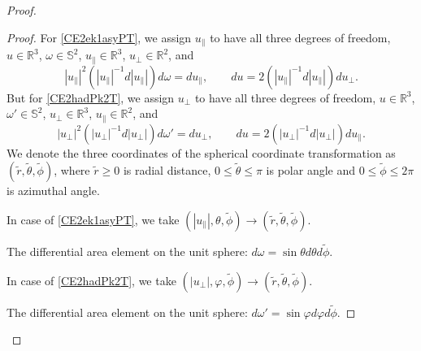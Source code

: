 \documentclass[reqno]{amsart}
\numberwithin{equation}{section}
\numberwithin{equation}{section}
\begin{document}
\begin{proof}
\begin{proof}
			For \eqref{CE2ek1asyPT}, we assign $u_{\parallel}$ to have all three degrees of freedom,  $u \in \mathbb{R}^3$, $\omega \in \mathbb{S}^2$, $u_{\parallel} \in \mathbb{R}^3$, $u_{\perp} \in \mathbb{R}^2$, and
			\begin{equation*}
				|u_{\parallel}|^{2}(|u_{\parallel}|^{-1}d|u_{\parallel}|)d\omega = du_{\parallel} ,\qquad du = 2(|u_{\parallel}|^{-1} d|u_{\parallel}|) du_{\perp}. 
			\end{equation*}
			But for \eqref{CE2hadPk2T}, we assign $u_{\perp}$ to have all three degrees of freedom,  $u \in \mathbb{R}^3$, $\omega' \in \mathbb{S}^2$, $u_{\perp} \in \mathbb{R}^3$, $u_{\parallel} \in \mathbb{R}^2$, and
			\begin{equation}\label{cgvbuprepdd}
				|u_{\perp}|^{2}(|u_{\perp}|^{-1}d|u_{\perp}|)d\omega' = du_{\perp} ,\qquad du =2 (|u_{\perp}|^{-1} d|u_\perp|) du_{\parallel}. 
			\end{equation}
			We denote the three coordinates of the spherical coordinate transformation as $(\tilde{r},\tilde{\theta},\tilde{\phi})$, where $\tilde{r}\geq0$ is radial distance, $0\leq\tilde{\theta}\leq \pi$ is polar angle and $0\leq\tilde{\phi}\leq 2 \pi$ is azimuthal angle.  
			
			In case of \eqref{CE2ek1asyPT}, we take $(|u_{\parallel}|,\theta,\tilde{\phi})\rightarrow(\tilde{r},\tilde{\theta},\tilde{\phi})$. 
			
			The differential area element on the unit sphere: $d\omega=\sin\theta d\theta d\tilde{\phi}$.
		
			In case of \eqref{CE2hadPk2T}, we take $(|u_{\perp}|,\varphi,\tilde{\phi})\rightarrow(\tilde{r},\tilde{\theta},\tilde{\phi})$. 
			
			The differential area element on the unit sphere: $d\omega'=\sin\varphi d\varphi d\tilde{\phi}$.
			

\end{proof}
\end{proof}
\end{document}
